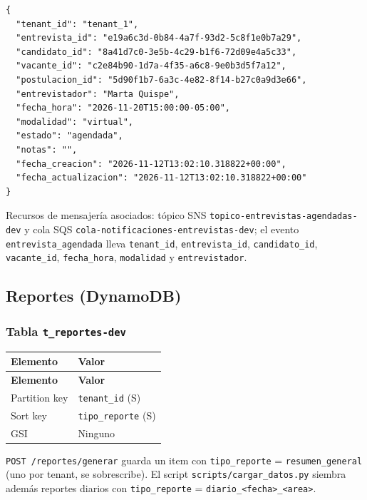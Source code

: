 \begin{lstlisting}
{
  "tenant_id": "tenant_1",
  "entrevista_id": "e19a6c3d-0b84-4a7f-93d2-5c8f1e0b7a29",
  "candidato_id": "8a41d7c0-3e5b-4c29-b1f6-72d09e4a5c33",
  "vacante_id": "c2e84b90-1d7a-4f35-a6c8-9e0b3d5f7a12",
  "postulacion_id": "5d90f1b7-6a3c-4e82-8f14-b27c0a9d3e66",
  "entrevistador": "Marta Quispe",
  "fecha_hora": "2026-11-20T15:00:00-05:00",
  "modalidad": "virtual",
  "estado": "agendada",
  "notas": "",
  "fecha_creacion": "2026-11-12T13:02:10.318822+00:00",
  "fecha_actualizacion": "2026-11-12T13:02:10.318822+00:00"
}
\end{lstlisting}

Recursos de mensajería asociados: tópico SNS \texttt{topico-\allowbreak{}entrevistas-\allowbreak{}agendadas-\allowbreak{}dev} y cola SQS \texttt{cola-\allowbreak{}notificaciones-\allowbreak{}entrevistas-\allowbreak{}dev}; el evento \texttt{entrevista\_\allowbreak{}agendada} lleva \texttt{tenant\_\allowbreak{}id}, \texttt{entrevista\_\allowbreak{}id}, \texttt{candidato\_\allowbreak{}id}, \texttt{vacante\_\allowbreak{}id}, \texttt{fecha\_\allowbreak{}hora}, \texttt{modalidad} y \texttt{entrevistador}.

\subsection{Reportes (DynamoDB)}
\subsubsection{Tabla \texttt{t\_reportes-dev}}
\begin{longtable}{p{3.5cm}p{10.5cm}}
\toprule
\textbf{Elemento} & \textbf{Valor} \\
\midrule
\endfirsthead
\toprule
\textbf{Elemento} & \textbf{Valor} \\
\midrule
\endhead
\bottomrule
\endlastfoot
Partition key & \texttt{tenant\_\allowbreak{}id} (S) \\
Sort key & \texttt{tipo\_\allowbreak{}reporte} (S) \\
GSI & Ninguno \\
\end{longtable}

\texttt{POST /reportes/generar} guarda un item con \texttt{tipo\_\allowbreak{}reporte} = \texttt{resumen\_\allowbreak{}general} (uno por tenant, se sobrescribe). El script \texttt{scripts/cargar\_\allowbreak{}datos.py} siembra además reportes diarios con \texttt{tipo\_\allowbreak{}reporte} = \texttt{diario\_\allowbreak{}\textless{}fecha\textgreater{}\_\allowbreak{}\textless{}area\textgreater{}}.

